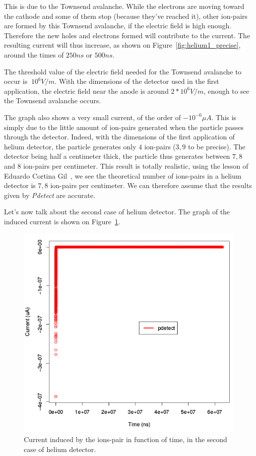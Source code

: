 \documentclass[11pt]{article}
\begin{document}
				This is due to the Townsend avalanche. While the electrons are moving toward the cathode and some of them stop
				(because they've reached it), other ion-pairs are formed by this Townsend avalanche, if the electric field is
				high enough. Therefore the new holes and electrons formed will contribute to the current. The resulting current
				will thus increase, as shown on Figure~\ref{fig:helium1_precise}, around the times of $250ns$ or $500ns$.

				The threshold value of the electric field needed for the Townsend avalanche to occur is $~10^6V/m$. With the
				dimensions of the detector used in the first application, the electric field near the anode is around
				$2*10^6V/m$, enough to see the Townsend avalanche occurs.

				The graph also shows a very small current, of the order of $-10^{-6}\mu A$. This is simply due to the little
				amount of ion-pairs generated when the particle passes through the detector. Indeed, with the dimensions of the
				first application of helium detector, the particle generates only $4$ ion-pairs ($3,9$ to be precise). The detector
				being half a centimeter thick, the particle thus generates between $7,8$ and $8$ ion-pairs per centimeter.
				This result is totally realistic, using the lesson of Eduardo Cortina Gil~\cite{lphy2236}, we see the theoretical
				number of ions-pairs in a helium detector is $7,8$ ion-pairs per centimeter. We can therefore assume that the
				results given by \textit{Pdetect} are accurate.

				Let's now talk about the second case of helium detector. The graph of the induced current is shown on
				Figure~\ref{fig:helium2_unprecise}.

				\begin{figure}[H]
				  \center
				  \includegraphics[scale=0.4]{images/applications/helium2_unprecise.png}
				  \caption{Current induced by the ions-pair in function of time, in the second case of helium detector.}
				  \label{fig:helium2_unprecise}
				\end{figure}
\end{document}

